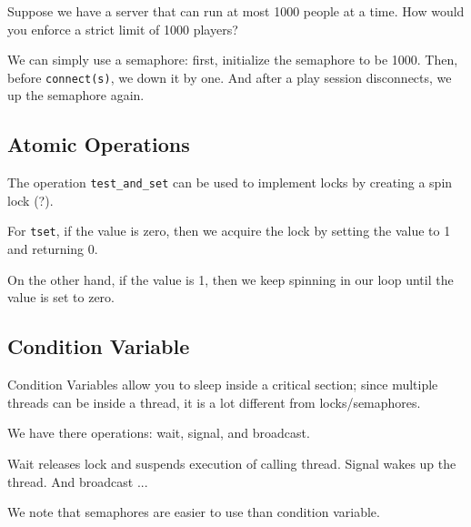 \documentclass[openany]{book}
\begin{document}
\begin{hw}
	Suppose we have a server that can run at most 1000 people at a time. How would you enforce a strict limit of 1000 players?
\end{hw}
\begin{solution}
	We can simply use a semaphore: first, initialize the semaphore to be 1000. Then, before \texttt{connect(s)}, we down it by one. And after a play session disconnects, we up the semaphore again. 
\end{solution}

\subsection{Atomic Operations}
The operation \texttt{test_and_set} can be used to implement locks by creating a spin lock (?).

For \texttt{tset}, if the value is zero, then we acquire the lock by setting the value to 1 and returning 0.

On the other hand, if the value is 1, then we keep spinning in our loop until the value is set to zero.

\subsection{Condition Variable}
Condition Variables allow you to sleep inside a critical section; since multiple threads can be inside a thread, it is a lot different from locks/semaphores.

We have there operations: wait, signal, and broadcast.

Wait releases lock and suspends execution of calling thread. Signal wakes up the thread. And broadcast ...

We note that semaphores are easier to use than condition variable.
\end{document}
